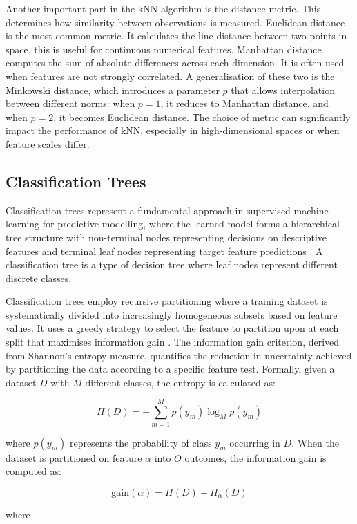 \documentclass[10pt, conference]{IEEEtran}
\begin{document}
Another important part in the kNN algorithm is the distance metric. This determines how similarity between observations is measured. Euclidean distance is the most common metric. It calculates the line distance between two points in space, this is useful for continuous numerical features. Manhattan distance computes the sum of absolute differences across each dimension. It is often used when features are not strongly correlated. A generalisation of these two is the Minkowski distance, which introduces a parameter \(p\) that allows interpolation between different norms: when \(p = 1\), it reduces to Manhattan distance, and when \(p = 2\), it becomes Euclidean distance. The choice of metric can significantly impact the performance of kNN, especially in high-dimensional spaces or when feature scales differ.

\subsection{Classification Trees}
Classification trees represent a fundamental approach in supervised machine learning for predictive modelling, where the learned model forms a hierarchical tree structure with non-terminal nodes representing decisions on descriptive features and terminal leaf nodes representing target feature predictions \cite{quinlan1993c45}. A classification tree is a type of decision tree where leaf nodes represent different discrete classes.

Classification trees employ recursive partitioning where a training dataset is systematically divided into increasingly homogeneous subsets based on feature values. It uses a greedy strategy to select the feature to partition upon at each split that maximises information gain \cite{kelleher2020fundamentals}. The information gain criterion, derived from Shannon's entropy measure, quantifies the reduction in uncertainty achieved by partitioning the data according to a specific feature test.
Formally, given a dataset $D$ with $M$ different classes, the entropy is calculated as:

\[
H(D) = -\sum_{m=1}^{M} p(y_m) \log_{M} p(y_m)
\]

where $p(y_m)$ represents the probability of class $y_m$ occurring in $D$. When the dataset is partitioned on feature $\alpha$ into $O$ outcomes, the information gain is computed as:

\[
\text{gain}(\alpha) = H(D) - H_\alpha(D)
\]

where 
\end{document}
